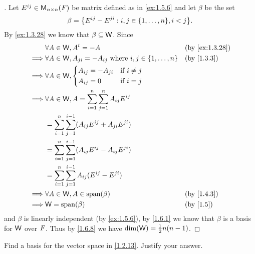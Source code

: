 \begin{proof}[]
  Let \(E^{i j} \in \mathsf{M}_{{n} \times n}({\mathit{F}})\) be matrix defined as in \cref{ex:1.5.6} and let \(\beta\) be the set
  \[
    \beta = \set{E^{i j} - E^{j i} : i, j \in \set{1, \dots, n}, i < j}.
  \]
  By \cref{ex:1.3.28} we know that \(\beta \subseteq \mathsf{W}\).
  Since
  \begin{align*}
             & \forall A \in \W, \tp{A} = -A                                                  &  & \text{(by \cref{ex:1.3.28})} \\
    \implies & \forall A \in \W, A_{j i} = -A_{i j} \text{ where } i, j \in \set{1, \dots, n} &  & \text{(by \cref{1.3.3})}     \\
    \implies & \forall A \in \W, \begin{dcases}
      A_{i j} = -A_{j i} & \text{if } i \neq j \\
      A_{i j} = 0        & \text{if } i = j
    \end{dcases}                                                                     \\
    \implies & \forall A \in \W, A = \sum_{i = 1}^n \sum_{j = 1}^n A_{i j} E^{i j}                                              \\
             & = \sum_{i = 1}^n \sum_{j = 1}^{i - 1} (A_{i j} E^{i j} + A_{j i} E^{j i})                                        \\
             & = \sum_{i = 1}^n \sum_{j = 1}^{i - 1} (A_{i j} E^{i j} - A_{i j} E^{j i})                                        \\
             & = \sum_{i = 1}^n \sum_{j = 1}^{i - 1} A_{i j} (E^{i j} - E^{j i})                                                \\
    \implies & \forall A \in \W, A \in \spn{\beta}                                            &  & \text{(by \cref{1.4.3})}     \\
    \implies & \W = \spn{\beta}                                                               &  & \text{(by \cref{1.5})}
  \end{align*}
  and \(\beta\) is linearly independent (by \cref{ex:1.5.6}), by \cref{1.6.1} we know that \(\beta\) is a basis for \(\mathsf{W}\) over \(\mathit{F}\).
  Thus by \cref{1.6.8} we have \(\dim(\mathsf{W}) = \frac{1}{2} n(n - 1)\).
\end{proof}

\begin{ex}\label{ex:1.6.18}
  Find a basis for the vector space in \cref{1.2.13}.
  Justify your answer.
\end{ex}

